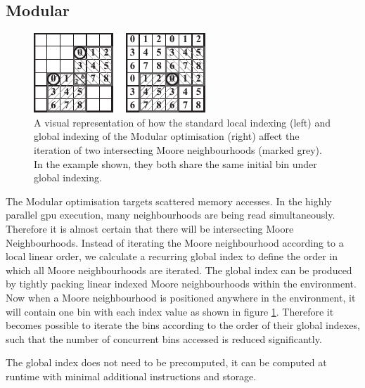 
  \subsection{Modular}
\begin{figure}[!t]
\centering
\includegraphics[width=\linewidth]{../resources/modular/modular.pdf}
\caption{\label{fig:modular}A visual representation of how the standard local indexing (left) and global indexing of the Modular optimisation (right) affect the iteration of two intersecting Moore neighbourhoods (marked grey). In the example shown, they both share the same initial bin under global indexing.}
\end{figure}
    The Modular optimisation targets scattered memory accesses. In the highly parallel \gls{gpu} execution, many neighbourhoods are being read simultaneously. Therefore it is almost certain that there will be intersecting Moore Neighbourhoods. Instead of iterating the Moore neighbourhood according to a local linear order, we calculate a recurring global index to define the order in which all Moore neighbourhoods are iterated. The global index can be produced by tightly packing linear indexed Moore neighbourhoods within the environment. Now when a Moore neighbourhood is positioned anywhere in the environment, it will contain one bin with each index value as shown in figure \ref{fig:modular}. Therefore it becomes possible to iterate the bins according to the order of their global indexes, such that the number of concurrent bins accessed is reduced significantly.
    
    The global index does not need to be precomputed, it can be computed at runtime with minimal additional instructions and storage.
    
